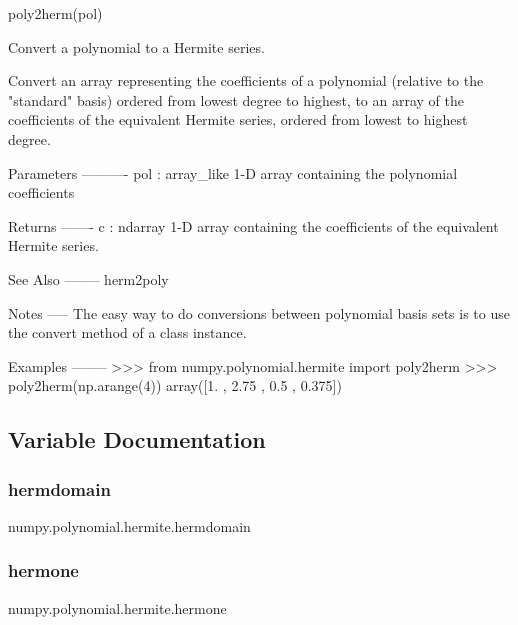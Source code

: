 \begin{DoxyVerb}poly2herm(pol)

Convert a polynomial to a Hermite series.

Convert an array representing the coefficients of a polynomial (relative
to the "standard" basis) ordered from lowest degree to highest, to an
array of the coefficients of the equivalent Hermite series, ordered
from lowest to highest degree.

Parameters
----------
pol : array_like
    1-D array containing the polynomial coefficients

Returns
-------
c : ndarray
    1-D array containing the coefficients of the equivalent Hermite
    series.

See Also
--------
herm2poly

Notes
-----
The easy way to do conversions between polynomial basis sets
is to use the convert method of a class instance.

Examples
--------
>>> from numpy.polynomial.hermite import poly2herm
>>> poly2herm(np.arange(4))
array([1.   ,  2.75 ,  0.5  ,  0.375])\end{DoxyVerb}
 

\subsection{Variable Documentation}
\mbox{\label{namespacenumpy_1_1polynomial_1_1hermite_aa0b8fd679b5ed672328fa24df25edbe4}} 
\subsubsection{\texorpdfstring{hermdomain}{hermdomain}}
{\footnotesize\ttfamily numpy.\+polynomial.\+hermite.\+hermdomain}

\mbox{\label{namespacenumpy_1_1polynomial_1_1hermite_a441ffd8d7877ebdc21615a66459904cf}} 
\subsubsection{\texorpdfstring{hermone}{hermone}}
{\footnotesize\ttfamily numpy.\+polynomial.\+hermite.\+hermone}

